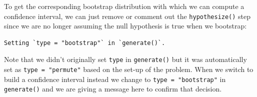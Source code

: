 \documentclass[12pt, krantz2,]{krantz}
\makeatletter
\newenvironment{Shaded}{\begin{snugshade}}{\end{snugshade}}
\newcommand{\CommentTok}[1]{\textcolor[rgb]{0.37,0.37,0.37}{\textit{#1}}}
\newcommand{\DataTypeTok}[1]{\textcolor[rgb]{0.27,0.27,0.27}{#1}}
\newcommand{\DecValTok}[1]{\textcolor[rgb]{0.06,0.06,0.06}{#1}}
\newcommand{\KeywordTok}[1]{\textcolor[rgb]{0.27,0.27,0.27}{\textbf{#1}}}
\newcommand{\NormalTok}[1]{#1}
\newcommand{\OperatorTok}[1]{\textcolor[rgb]{0.43,0.43,0.43}{\textbf{#1}}}
\newcommand{\StringTok}[1]{\textcolor[rgb]{0.5,0.5,0.5}{#1}}
\newenvironment{kframe}{%
\medskip{}
\setlength{\fboxsep}{.8em}
 \def\at@end@of@kframe{}%
 \ifinner\ifhmode%
  \def\at@end@of@kframe{\end{minipage}}%
  \begin{minipage}{\columnwidth}%
 \fi\fi%
 \def\FrameCommand##1{\hskip\@totalleftmargin \hskip-\fboxsep
 \colorbox{shadecolor}{##1}\hskip-\fboxsep
     \hskip-\linewidth \hskip-\@totalleftmargin \hskip\columnwidth}%
 \MakeFramed {\advance\hsize-\width
   \@totalleftmargin\z@ \linewidth\hsize
   \@setminipage}}%
 {\par\unskip\endMakeFramed%
 \at@end@of@kframe}
\renewenvironment{Shaded}{\begin{kframe}}{\end{kframe}}
\makeatother
\begin{document}
\begin{Shaded}
\end{Shaded}

To get the corresponding bootstrap distribution with which we can compute a confidence interval, we can just remove or comment out the \texttt{hypothesize()} step since we are no longer assuming the null hypothesis is true when we bootstrap:

\begin{Shaded}
\end{Shaded}

\begin{verbatim}
Setting `type = "bootstrap"` in `generate()`.
\end{verbatim}

Note that we didn't originally set \texttt{type} in \texttt{generate()} but it was automatically set as \texttt{type\ =\ "permute"} based on the set-up of the problem. When we switch to build a confidence interval instead we change to \texttt{type\ =\ "bootstrap"} in \texttt{generate()} and we are giving a message here to confirm that decision.
\end{document}
